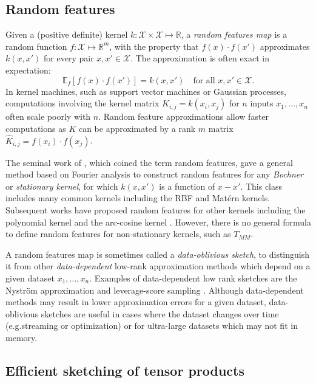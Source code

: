 \documentclass{article}
\theoremstyle{plain}
\theoremstyle{definition}
\theoremstyle{remark}
\begin{document}
\subsection{Random features}

Given a (positive definite) kernel $k:\mathcal{X}\times\mathcal{X}\mapsto\mathbb{R}$, a \emph{random features map} 
is a random function
$f:\mathcal{X}\mapsto\mathbb{R}^m$, with the property that  $f(x)\cdot f(x')$ approximates $k(x,x')$ for every pair $x,x'\in\mathcal X$. The approximation is often exact in expectation:
\begin{equation}\label{eqn:random-feature-definition}
    \mathbb{E}_f\left[f(x)\cdot f(x')\right]=k(x,x') \quad \text{for all }x,x'\in\mathcal X.
\end{equation}
In kernel machines, such as support vector machines or Gaussian processes, computations involving the kernel matrix $K_{i,j} = k(x_i,x_j)$ for $n$ inputs $x_1,\dots,x_n$ often scale poorly with $n$.
Random feature approximations allow faster computations as $K$ can be approximated by a rank $m$ matrix $\widehat K_{i,j} = f(x_i)\cdot f(x_j)$. 

The seminal work of \citet{rahimi2007random}, which coined the term random features, gave a general method based on Fourier analysis to construct random features for any \emph{Bochner} or \emph{stationary kernel}, for which $k(x,x')$ is a function of $x-x'$. This class includes many common kernels including the RBF and Mat\'{e}rn kernels.
Subsequent works have proposed random features for other kernels including the polynomial kernel and the arc-cosine kernel 
\citep{liu2021random}.
However, there is no general formula to define random features for non-stationary kernels, such as $T_{MM}$.

A random features map is sometimes called a \emph{data-oblivious sketch}, to distinguish it from other \emph{data-dependent} low-rank approximation methods which depend on a given dataset $x_1,\dots,x_n$.
Examples of data-dependent low rank sketches are the Nystr\"{o}m approximation and leverage-score sampling \citep{drineas2005nystrom,drineas2012fast}.
Although data-dependent methods may result in lower approximation errors for a given dataset,
data-oblivious sketches are useful in cases where the dataset  changes over time (e.g.\@ streaming or optimization)
or for ultra-large datasets which may not fit in memory.

\subsection{Efficient sketching of tensor products}
\end{document}
